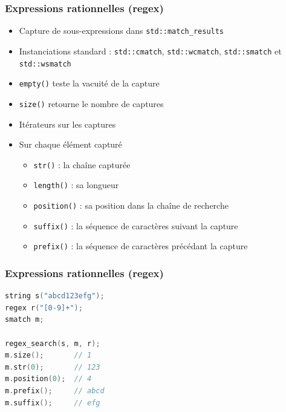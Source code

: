 \documentclass[C++.tex]{subfiles}
\begin{document}
\begin{frame}[fragile]
	\frametitle{Expressions rationnelles (regex)}
	\begin{itemize}
		\item Capture de sous-expressions dans \lstinline|std::match_results|
		\item Instanciations standard : \lstinline|std::cmatch|, \lstinline|std::wcmatch|, \lstinline|std::smatch| et \lstinline|std::wsmatch|
		\item \lstinline|empty()| teste la vacuité de la capture
		\item \lstinline|size()| retourne le nombre de captures
		\item Itérateurs sur les captures
		\item Sur chaque élément capturé
		\begin{itemize}
			\item \lstinline|str()| : la chaîne capturée
			\item \lstinline|length()| : sa longueur
			\item \lstinline|position()| : sa position dans la chaîne de recherche
			\item \lstinline|suffix()| : la séquence de caractères suivant la capture
			\item \lstinline|prefix()| : la séquence de caractères précédant la capture
		\end{itemize}
	\end{itemize}
\end{frame}

\begin{frame}[fragile]
	\frametitle{Expressions rationnelles (regex)}
	\begin{lstlisting}[language=C++]
string s("abcd123efg");
regex r("[0-9]+");
smatch m;

regex_search(s, m, r);
m.size();       // 1
m.str(0);       // 123
m.position(0);  // 4
m.prefix();     // abcd
m.suffix();     // efg\end{lstlisting}
\end{frame}
\end{document}
